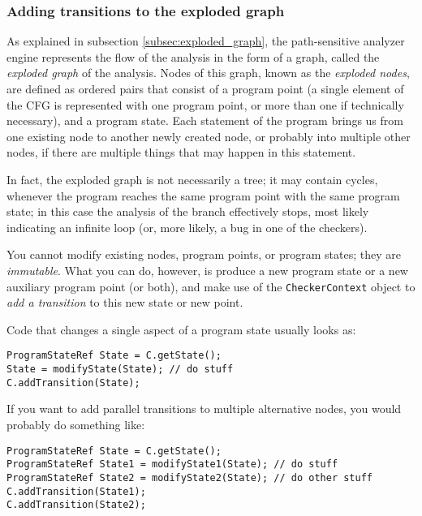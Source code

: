 \documentclass[a4paper,12pt]{article}
\newenvironment{nobr}{\begin{minipage}{\textwidth}\setlength\parskip{1em}
}{\end{minipage}\ignorespacesafterend}
\begin{document}
\subsubsection{Adding transitions to the exploded graph}

As explained in subsection \ref{subsec:exploded_graph}, the path-sensitive analyzer engine represents the flow of the analysis in the form of a graph, called the \emph{exploded graph} of the analysis. Nodes of this graph, known as the \emph{exploded nodes}, are defined as ordered pairs that consist of a program point (a single element of the CFG is represented with one program point, or more than one if technically necessary), and a program state. Each statement of the program brings us from one existing node to another newly created node, or probably into multiple other nodes, if there are multiple things that may happen in this statement.

In fact, the exploded graph is not necessarily a tree; it may contain cycles, whenever the program reaches the same program point with the same program state; in this case the analysis of the branch effectively stops, most likely indicating an infinite loop (or, more likely, a bug in one of the checkers).

You cannot modify existing nodes, program points, or program states; they are \emph{immutable}. What you can do, however, is produce a new program state or a new auxiliary program point (or both), and make use of the \lstinline|CheckerContext| object to \emph{add a transition} to this new state or new point.

\begin{nobr}
Code that changes a single aspect of a program state usually looks as:

\begin{lstlisting}[style=cplusplus,numbers=none]
ProgramStateRef State = C.getState();
State = modifyState(State); // do stuff
C.addTransition(State);
\end{lstlisting}
\end{nobr}

\begin{nobr}
If you want to add parallel transitions to multiple alternative nodes, you would probably do something like:

\begin{lstlisting}[style=cplusplus,numbers=none]
ProgramStateRef State = C.getState();
ProgramStateRef State1 = modifyState1(State); // do stuff
ProgramStateRef State2 = modifyState2(State); // do other stuff
C.addTransition(State1);
C.addTransition(State2);
\end{lstlisting}
\end{nobr}
\end{document}
